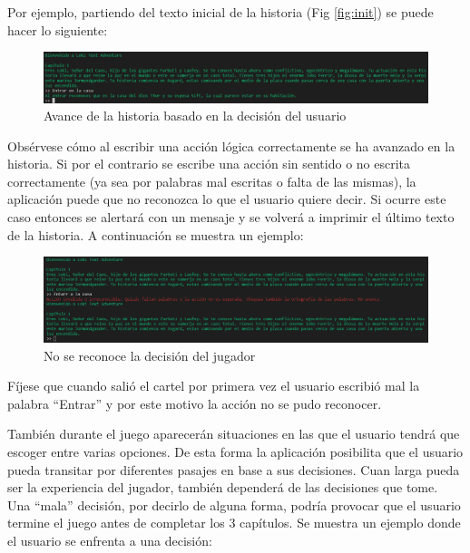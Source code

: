 \documentclass[12pt]{article}
\begin{document}
Por ejemplo, partiendo del texto inicial de la historia (Fig \ref{fig:init}) se puede hacer lo siguiente:

\begin{figure}[h]
	\begin{center}
		\includegraphics[width =15.0cm]{./img/Avance.png}

        \caption{Avance de la historia basado en la decisión del usuario}
	\end{center}
\end{figure}

Obsérvese cómo al escribir una acción lógica correctamente se ha avanzado en la historia. Si por el contrario se escribe una acción sin sentido o no escrita correctamente (ya sea por palabras mal escritas o falta de las mismas), la aplicación puede que no reconozca lo que el usuario quiere decir. Si ocurre este caso entonces se alertará con un mensaje y se volverá a imprimir el último texto de la historia. A continuación se muestra un ejemplo:

\begin{figure}[h]
	\begin{center}
		\includegraphics[width =15.0cm]{./img/No_avance.png}

        \caption{No se reconoce la decisión del jugador}
	\end{center}
\end{figure}

Fíjese que cuando salió el cartel por primera vez el usuario escribió mal la palabra ``Entrar'' y por este motivo la acción no se pudo reconocer. 

También durante el juego aparecerán situaciones en las que el usuario tendrá que escoger entre varias opciones. De esta forma la aplicación posibilita que el usuario pueda transitar por diferentes pasajes en base a sus decisiones. Cuan larga pueda ser la experiencia del jugador, también dependerá de las decisiones que tome. Una ``mala'' decisión, por decirlo de alguna forma, podría provocar que el usuario termine el juego antes de completar los 3 capítulos. Se muestra un ejemplo donde el usuario se enfrenta a una decisión: 
\end{document}
